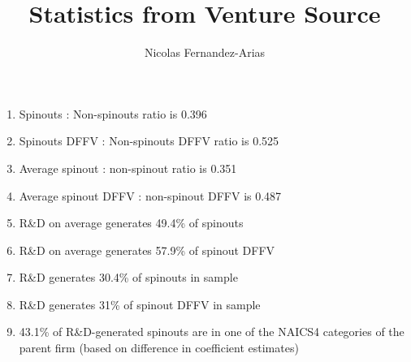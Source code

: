 \documentclass[12pt,english]{article}
\theoremstyle{remark}
\begin{document}
	
\title{Statistics from Venture Source}
\author{Nicolas Fernandez-Arias}
\maketitle

\begin{enumerate}
	\item Spinouts : Non-spinouts ratio is 0.396
	\item Spinouts DFFV : Non-spinouts DFFV ratio is 0.525
	\item Average spinout : non-spinout ratio is 0.351
	\item Average spinout DFFV : non-spinout DFFV is 0.487
	\item R\&D on average generates 49.4\% of spinouts
	\item R\&D on average generates 57.9\% of spinout DFFV
	\item R\&D generates 30.4\% of spinouts in sample
	\item R\&D generates 31\% of spinout DFFV in sample
	\item 43.1\% of R\&D-generated spinouts are in one of the NAICS4 categories of the parent firm (based on difference in coefficient estimates)
\end{enumerate}
\end{document}
